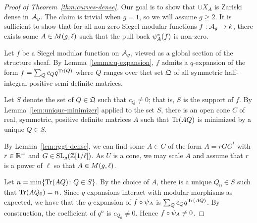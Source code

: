 \documentclass{amsart}
\begin{document}
\begin{proof}[Proof of Theorem~\ref{thm:curves-dense}]
  Our goal is to show that $\cup X_A$ is Zariski dense in $\mathcal{A}_g$. The claim is trivial when $g = 1$, so we will assume $g \geq 2$. It is sufficient to show that for all non-zero Siegel modular functions $f: \mathcal{A}_g \to k$, there exists some $A \in M(g,\ell)$ such that the pull back $\psi_{A}^*(f)$ is non-zero.

  Let $f$ be a Siegel modular function on $\mathcal{A}_g$, viewed as a global section of the structure sheaf. By Lemma~\ref{lemma:q-expansion}, $f$ admits a $q$-expansion of the form $f = \sum_Q c_Q q^{\operatorname{Tr}(Q)}$ where $Q$ ranges over thet set $\mathfrak{Q}$ of all symmetric half-integral positive semi-definite matrices. %

  Let $S$ denote the set of $Q \in \mathfrak{Q}$ such that $c_Q \neq 0$; that is, $S$ is the support of $f$. By Lemma~\ref{lem:unique-minimizer} applied to the set $S$, there is an open cone $C$ of real, symmetric, positive definite matrices $A$ such that $\operatorname{Tr}(AQ)$ is minimized by a unique $Q \in S$.

  By Lemma~\ref{lem:rggt-dense}, we can find some $A \in C$ of the form $A = rGG^t$ with $r \in \mathbb{R}^+$ and $G \in \operatorname{SL}_g(\mathbb{Z}[1/\ell])$. As $U$ is a cone, we may scale $A$ and assume that $r$ is a power of $\ell$ so that $A \in M(g,\ell)$.

  Let $n = \min \{\operatorname{Tr}(AQ) \colon Q \in S\}$. By the choice of $A$, there is a unique $Q_0 \in S$ such that $\operatorname{Tr}(AQ_0) = n$. %
  Since $q$-expansions interact
  with modular morphisms as expected, we have that the $q$-expansion of $f \circ \psi_{A}$ is $\sum_Q c_Q q^{\operatorname{Tr}(AQ)}$.   By construction, the coefficient of $q^n$ is $c_{Q_0} \neq 0$. Hence $f \circ \psi_{A} \neq 0$.
\end{proof}









\end{document}
